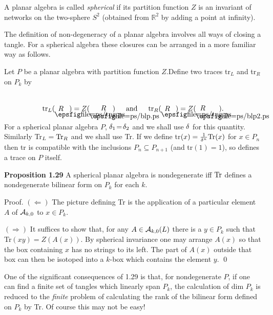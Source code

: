  A  planar algebra is called {\it spherical} 
if its partition function $Z$ is an invariant of
networks on the two-sphere $S^2$ (obtained from $\mathbb R^2$ by
adding a point at infinity).

\bs The definition of non-degeneracy of a planar algebra involves
all ways of closing a tangle. For a spherical algebra these
closures can be arranged in a more familiar way as follows.

 Let $P$ be a  planar algebra
with partition function $Z$.\linebreak Define two traces tr${}_L$
and tr${}_R$ on $P_k$ by
\[
 {\op{tr}}_L(\tangle{R})=Z(\boxlloop{R})\hskip 15pt  {\rm and}\hskip15pt 
{\op{tr}}_R(\tangle{ R})=Z(\boxrloop{R}).
\]


 For a spherical planar algebra $P$, $\delta_1\!=\!\delta_2$
and we shall use $\delta$ for this quantity. Similarly
Tr${}_L={\bf\rm{Tr}}_R$ and we shall use Tr. If we define
tr$(x)=\frac{1}{\delta^n} {\bf\rm{Tr}}(x)$ for $x\in P_n$ then tr is
compatible with the inclusions $P_n\subseteq P_{n+1}$
(and tr$(1)\!=\!1$), so defines a trace on $P$ itself.

\bs\ni
{\bf Proposition 1.29} A spherical planar algebra is
nondegenerate iff ${\bf\rm{Tr}}$ defines a nondegenerate bilinear form
on $P_k$ for each $k$.

\bs
{\sc Proof.} $(\Leftarrow)$ The picture defining Tr is the
application of a particular element $A$ of ${\cal A}_{k,0}$ to
$x\in P_k$.

$(\Rightarrow)$ It suffices to show that, for any $A\in{\cal A}_{k,0}(L)$
there is a $y\in P_k$ such that Tr$(xy)=Z(A(x))$.
By  spherical invariance one may arrange $A(x)$ so that the box containing
$x$ has no strings to its left. The part of $A(x)$ outside
that box can then be isotoped into a $k$-box which contains the element $y$.
\qed

 One of the significant consequences of
1.29 is that, for nondegenerate $P$, if one can find a finite
set of tangles which linearly span $P_k$, the calculation of
dim $P_k$ is reduced to the {\it finite} problem of calculating
the rank of the bilinear form defined on $P_k$ by Tr. Of course
this may not be easy!


